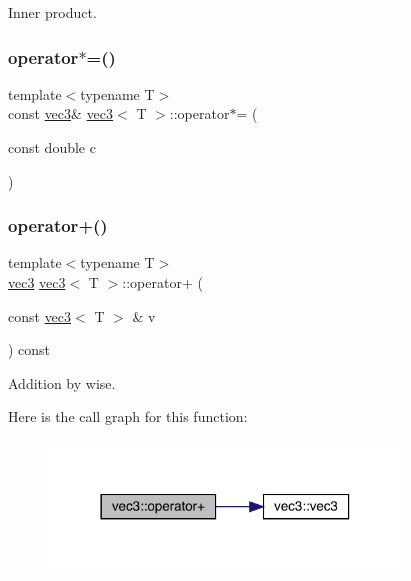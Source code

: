 Inner product. 

\mbox{\label{structvec3_a401db8071cae874abdd0bc04846ee27f}} 
\subsubsection{\texorpdfstring{operator$\ast$=()}{operator*=()}}
{\footnotesize\ttfamily template$<$typename T$>$ \\
const \mbox{\hyperlink{structvec3}{vec3}}\& \mbox{\hyperlink{structvec3}{vec3}}$<$ T $>$\+::operator$\ast$= (\begin{DoxyParamCaption}\item[{const double}]{c }\end{DoxyParamCaption})\hspace{0.3cm}{\ttfamily [inline]}}

\mbox{\label{structvec3_a255037f59863e54390e388dd07e7ee8f}} 
\subsubsection{\texorpdfstring{operator+()}{operator+()}\hspace{0.1cm}{\footnotesize\ttfamily [1/2]}}
{\footnotesize\ttfamily template$<$typename T$>$ \\
\mbox{\hyperlink{structvec3}{vec3}} \mbox{\hyperlink{structvec3}{vec3}}$<$ T $>$\+::operator+ (\begin{DoxyParamCaption}\item[{const \mbox{\hyperlink{structvec3}{vec3}}$<$ T $>$ \&}]{v }\end{DoxyParamCaption}) const\hspace{0.3cm}{\ttfamily [inline]}}



Addition by wise. 

Here is the call graph for this function\+:\nopagebreak
\begin{figure}[H]
\begin{center}
\leavevmode
\includegraphics[width=266pt]{structvec3_a255037f59863e54390e388dd07e7ee8f_cgraph}
\end{center}
\end{figure}
\mbox{\label{structvec3_a479dd2445daeeec47e6a5a8e4487f51b}} 
